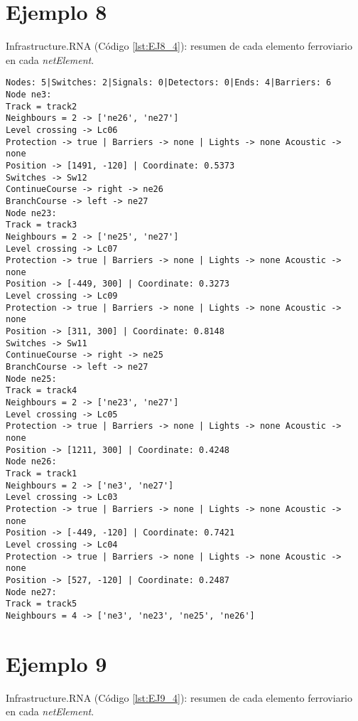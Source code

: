 	\section{Ejemplo 8}
	Infrastructure.RNA (Código \ref{lst:EJ8_4}): resumen de cada elemento ferroviario en cada \textit{netElement}.
	
	\begin{lstlisting}[language = {}, caption = Infrastructure.RNA, label = {lst:EJ8_4}]
Nodes: 5|Switches: 2|Signals: 0|Detectors: 0|Ends: 4|Barriers: 6
Node ne3:
Track = track2
Neighbours = 2 -> ['ne26', 'ne27']
Level crossing -> Lc06
Protection -> true | Barriers -> none | Lights -> none Acoustic -> none
Position -> [1491, -120] | Coordinate: 0.5373
Switches -> Sw12
ContinueCourse -> right -> ne26
BranchCourse -> left -> ne27
Node ne23:
Track = track3
Neighbours = 2 -> ['ne25', 'ne27']
Level crossing -> Lc07
Protection -> true | Barriers -> none | Lights -> none Acoustic -> none
Position -> [-449, 300] | Coordinate: 0.3273
Level crossing -> Lc09
Protection -> true | Barriers -> none | Lights -> none Acoustic -> none
Position -> [311, 300] | Coordinate: 0.8148
Switches -> Sw11
ContinueCourse -> right -> ne25
BranchCourse -> left -> ne27
Node ne25:
Track = track4
Neighbours = 2 -> ['ne23', 'ne27']
Level crossing -> Lc05
Protection -> true | Barriers -> none | Lights -> none Acoustic -> none
Position -> [1211, 300] | Coordinate: 0.4248
Node ne26:
Track = track1
Neighbours = 2 -> ['ne3', 'ne27']
Level crossing -> Lc03
Protection -> true | Barriers -> none | Lights -> none Acoustic -> none
Position -> [-449, -120] | Coordinate: 0.7421
Level crossing -> Lc04
Protection -> true | Barriers -> none | Lights -> none Acoustic -> none
Position -> [527, -120] | Coordinate: 0.2487
Node ne27:
Track = track5
Neighbours = 4 -> ['ne3', 'ne23', 'ne25', 'ne26']
	\end{lstlisting}	
	\section{Ejemplo 9}
	Infrastructure.RNA (Código \ref{lst:EJ9_4}): resumen de cada elemento ferroviario en cada \textit{netElement}.
	
